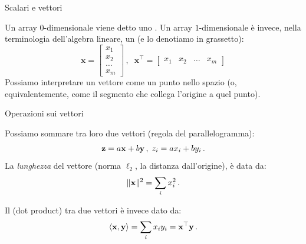 \documentclass[12pt,aspectratio=169]{beamer}
\begin{document}
\begin{frame}{Scalari e vettori}
	
	Un array $0$-dimensionale viene detto uno . Un array $1$-dimensionale è invece, nella terminologia dell'algebra lineare, un  (e lo denotiamo in grassetto):
	\begin{equation*}
		\mathbf{x} = \begin{bmatrix}
			x_1 \\ x_2 \\ \ldots \\ x_m
		\end{bmatrix} \,, \;\; \mathbf{x}^\top = \begin{bmatrix}
			x_1 & x_2 & \ldots & x_m
		\end{bmatrix}
	\end{equation*}
	Possiamo interpretare un vettore come un punto nello spazio (o, equivalentemente, come il segmento che collega l'origine a quel punto).
	
\end{frame}

\begin{frame}{Operazioni sui vettori}
	
	Possiamo sommare tra loro due vettori (regola del parallelogramma):
	\begin{equation*}
		\boldsymbol{\mathbf{z}} = a\boldsymbol{\mathbf{x}} + b\boldsymbol{\mathbf{y}} \,, \;{z}_i = ax_i + by_i \,.
	\end{equation*}
	La \textit{lunghezza} del vettore (norma $\ell_2$, la distanza dall'origine), è data da:
	\begin{equation}
		\lVert \boldsymbol{\mathbf{x}} \rVert^2 = \sum_i x_i^2 \,.
	\end{equation}
	\begin{tcolorbox}
		Il   (dot product) tra due vettori è invece dato da:
		\begin{equation*}
			\langle \boldsymbol{\mathbf{x}}, \boldsymbol{\mathbf{y}} \rangle = \sum_i x_iy_i = \boldsymbol{\mathbf{x}}^\top\boldsymbol{\mathbf{y}} \,.
		\end{equation*}
	\end{tcolorbox}
	
\end{frame}
\end{document}
